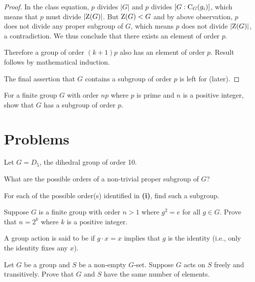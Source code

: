 \begin{proof}
    In the class equation, $p$ divides $|G|$ and $p$ divides $[G:\mathrm{C}_{G}(g_i)]$, which means that $p$ must divide $|\mathrm{Z}(G)|$. But $\mathrm{Z}(G) < G$ and by above observation, $p$ does not divide any proper subgroup of $G$, which means $p$ does not divide $|\mathrm{Z}(G)|$, a contradiction. We thus conclude that there exists an element of order $p$.

    Therefore a group of order $(k+1)p$ also has an element of order $p$. Result follows by mathematical induction.

    The final assertion that $G$ contains a subgroup of order $p$ is left for  (later).
\end{proof}

\begin{exercise}\label{exercise-group-of-order-multiple-of-prime-has-subgroup-of-prime-order}
    For a finite group $G$ with order $np$ where $p$ is prime and $n$ is a positive integer, show that $G$ has a subgroup of order $p$.
\end{exercise}

\newpage

\section{Problems}
\begin{problem}
    Let $G = D_5$, the dihedral group of order 10.
    \begin{partquestions}{\roman*}
        \item What are the possible orders of a non-trivial proper subgroup of $G$?
        \item For each of the possible order(s) identified in \textbf{(i)}, find such a subgroup.
    \end{partquestions}
\end{problem}

\begin{problem}
    Suppose $G$ is a finite group with order $n > 1$ where $g^2 = e$ for all $g \in G$. Prove that $n = 2^k$ where $k$ is a positive integer.
\end{problem}

\begin{problem}
    A group action is said to be  if $g\cdot x = x$ implies that $g$ is the identity (i.e., only the identity fixes any $x$).

    Let $G$ be a group and $S$ be a non-empty $G$-set. Suppose $G$ acts on $S$ freely and transitively. Prove that $G$ and $S$ have the same number of elements.
\end{problem}

